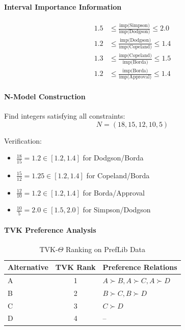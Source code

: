 \documentclass[conference]{IEEEtran}
\begin{document}
\paragraph{Interval Importance Information}

\begin{align}
	1.5 &\leq \frac{\text{imp(Simpson)}}{\text{imp(Dodgson)}} \leq 2.0 \\
	1.2 &\leq \frac{\text{imp(Dodgson)}}{\text{imp(Copeland)}} \leq 1.4 \\
	1.3 &\leq \frac{\text{imp(Copeland)}}{\text{imp(Borda)}} \leq 1.5 \\
	1.2 &\leq \frac{\text{imp(Borda)}}{\text{imp(Approval)}} \leq 1.4
\end{align}

\paragraph{N-Model Construction}

Find integers satisfying all constraints:
\begin{equation}
	N = (18, 15, 12, 10, 5)
\end{equation}

Verification:
\begin{itemize}
	\item $\frac{18}{15} = 1.2 \in [1.2, 1.4]$ for Dodgson/Borda \checkmark
	\item $\frac{15}{12} = 1.25 \in [1.2, 1.4]$ for Copeland/Borda \checkmark
	\item $\frac{12}{10} = 1.2 \in [1.2, 1.4]$ for Borda/Approval \checkmark
	\item $\frac{10}{5} = 2.0 \in [1.5, 2.0]$ for Simpson/Dodgson \checkmark
\end{itemize}

\paragraph{TVK Preference Analysis}

\begin{table}[H]
	\setlength{\tabcolsep}{1.3pt}  %
	\renewcommand{\arraystretch}{1.5} 
	\centering
	\centering
	\caption{TVK-$\Theta$ Ranking on PrefLib Data}
	\label{tab:preflib_tvk_results}
	\begin{tabular}{|l|c|l|}
		\hline
		\textbf{Alternative} & \textbf{TVK Rank} & \textbf{Preference Relations} \\
		\hline
		A & 1 & $A \succ B, A \succ C, A \succ D$ \\
		B & 2 & $B \succ C, B \succ D$ \\
		C & 3 & $C \succ D$ \\
		D & 4 & -- \\
		\hline
	\end{tabular}
\end{table}
\end{document}
